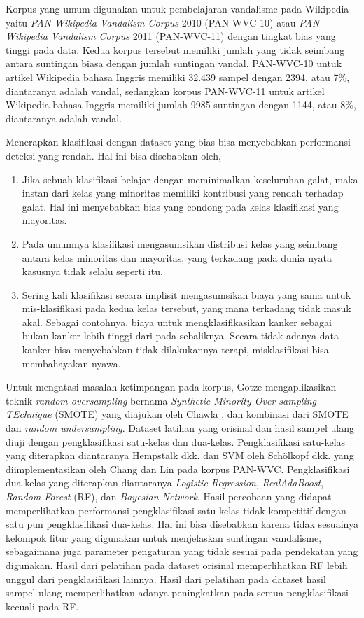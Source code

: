 Korpus yang umum digunakan untuk pembelajaran vandalisme pada Wikipedia yaitu
\textit{PAN Wikipedia Vandalism Corpus} 2010 (PAN-WVC-10)
\cite{potthast:2010b}
atau
\textit{PAN Wikipedia Vandalism Corpus} 2011 (PAN-WVC-11)
\cite{potthast:2010b}
dengan tingkat bias yang tinggi pada data.
Kedua korpus tersebut memiliki jumlah yang tidak seimbang antara suntingan
biasa dengan jumlah suntingan vandal.
PAN-WVC-10 untuk artikel Wikipedia bahasa Inggris memiliki 32.439 sampel dengan
2394, atau 7\%, diantaranya adalah vandal, sedangkan korpus PAN-WVC-11 untuk
artikel Wikipedia bahasa Inggris memiliki jumlah 9985 suntingan dengan 1144,
atau 8\%, diantaranya adalah vandal.

\newpage
Menerapkan klasifikasi dengan dataset yang bias bisa menyebabkan performansi
deteksi yang rendah.
Hal ini bisa disebabkan oleh,
\begin{enumerate}
	\item Jika sebuah klasifikasi belajar dengan meminimalkan keseluruhan
	galat, maka instan dari kelas yang minoritas memiliki kontribusi yang
	rendah terhadap galat.
	Hal ini menyebabkan bias yang condong pada kelas klasifikasi yang
	mayoritas.
	\item Pada umumnya klasifikasi mengasumsikan distribusi kelas yang
	seimbang antara kelas minoritas dan mayoritas, yang terkadang pada
	dunia nyata kasusnya tidak selalu seperti itu.
	\item Sering kali klasifikasi secara implisit mengasumsikan biaya yang
	sama untuk mis-klasifikasi pada kedua kelas tersebut, yang mana
	terkadang tidak masuk akal.
	Sebagai contohnya, biaya untuk mengklasifikasikan kanker sebagai bukan
	kanker lebih tinggi dari pada sebaliknya.
	Secara tidak adanya data kanker bisa menyebabkan tidak dilakukannya
	terapi, misklasifikasi bisa membahayakan nyawa.
\end{enumerate}

Untuk mengatasi masalah ketimpangan pada korpus, Gotze
\cite{gotze2014advanced}
mengaplikasikan teknik
\textit{random oversampling}
bernama
\textit{Synthetic Minority Over-sampling TEchnique} (SMOTE)
yang diajukan oleh Chawla
\cite{chawla2002smote},
dan kombinasi dari SMOTE dan
\textit{random undersampling}.
Dataset latihan yang orisinal dan hasil sampel ulang diuji dengan
pengklasifikasi satu-kelas dan dua-kelas.
Pengklasifikasi satu-kelas yang diterapkan diantaranya Hempstalk dkk.
\cite{hempstalk2008one}
dan SVM oleh Schölkopf dkk.
\cite{scholkopf1999support}
yang diimplementasikan oleh Chang dan Lin
\cite{chang2011libsvm}
pada korpus PAN-WVC.
Pengklasifikasi dua-kelas yang diterapkan diantaranya
\textit{Logistic Regression},
\textit{RealAdaBoost},
\textit{Random Forest} (RF), dan
\textit{Bayesian Network}.
Hasil percobaan yang didapat memperlihatkan performansi pengklasifikasi
satu-kelas tidak kompetitif dengan satu pun pengklasifikasi dua-kelas.
Hal ini bisa disebabkan karena tidak sesuainya kelompok fitur yang digunakan
untuk menjelaskan suntingan vandalisme, sebagaimana juga parameter pengaturan
yang tidak sesuai pada pendekatan yang digunakan.
Hasil dari pelatihan pada dataset orisinal memperlihatkan RF
lebih unggul dari pengklasifikasi lainnya.
Hasil dari pelatihan pada dataset hasil sampel ulang memperlihatkan adanya
peningkatkan pada semua pengklasifikasi kecuali pada RF.

